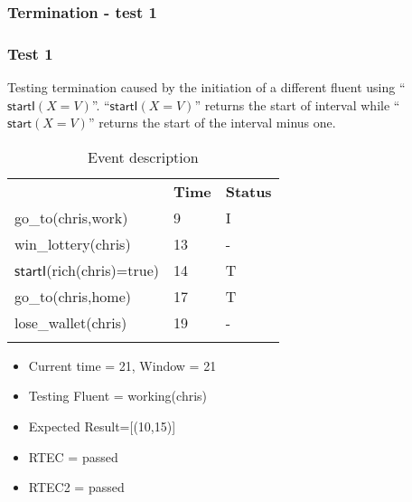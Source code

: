 \documentclass[8pt]{beamer}
\def \patsize {}
\def\startE{\textsf{\patsize start}}
\def\startI{\textsf{\patsize startI}}
\begin{document}
\begin{frame}
    \frametitle{Termination - test 1}
    \subsubsection{Test 1}
    \small
    Testing termination caused by the initiation of a different fluent using ``$\startI(X=V)$''. ``$\startI(X=V)$'' returns the start of interval while
    ``$\startE(X=V)$'' returns the start of the interval minus one.

    \begin{minipage}{0.48\linewidth}
        \begin{table}[t!]
            \caption{Event description}
            \begin{center}

                \begin{tabular}{lll}
                    \hline\noalign{\smallskip}
                    \multicolumn{1}{l}{\textbf{Event}} & \multicolumn{1}{c}{\textbf{Time}} & \multicolumn{1}{c}{\textbf{Status}} \\
                    go\_to(chris,work)&9&I\\
                    win\_lottery(chris)&13& -\\
                    $\startI$(rich(chris)=true)&14& T\\
                    go\_to(chris,home)&17&T\\
                    lose\_wallet(chris)&19&-\\
                    \noalign{\smallskip}
                    \hline
                \end{tabular}
            \end{center}
        \end{table}
        \begin{itemize}
            \item Current time = 21, Window = 21
            \item Testing Fluent = working(chris)
            \item Expected Result=[(10,15)]
            \item RTEC = passed
            \item RTEC2 = passed
        \end{itemize}
    \end{minipage}
    \begin{minipage}{0.48\linewidth}



\end{minipage}
\end{frame}
\end{document}

